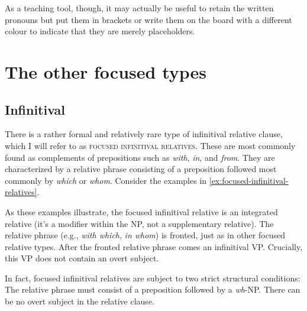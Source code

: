 As a teaching tool, though, it may actually be useful to retain the written pronouns but put them in brackets or write them on the board with a different colour to indicate that they are merely placeholders.

\section{The other focused types}
\subsection{Infinitival}

There is a rather formal and relatively rare type of infinitival relative clause, which I will refer to as \textsc{focused infinitival relatives}. These are most commonly found as complements of prepositions such as \textit{with}, \textit{in}, and \textit{from}. They are characterized by a relative phrase consisting of a preposition followed most commonly by \textit{which} or \textit{whom}. Consider the examples in \ref{ex:focused-infinitival-relatives}.

\begin{samepage}
    \ea \label{ex:focused-infinitival-relatives}
        \z
    \z
\end{samepage}

As these examples illustrate, the focused infinitival relative is an integrated relative (it's a modifier within the NP, not a supplementary relative). The relative phrase (e.g., \textit{with which}, \textit{in whom}) is fronted, just as in other focused relative types. After the fronted relative phrase comes an infinitival VP. Crucially, this VP does not contain an overt subject.

In fact, focused infinitival relatives are subject to two strict structural conditions:
\ea \label{ex:focused-infinitival-restrictions}
    \ea  The relative phrase must consist of a preposition followed by a \textit{wh}-NP.
    \ex  There can be no overt subject in the relative clause.
    \z
\z

